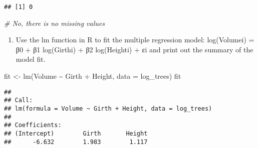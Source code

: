 \documentclass[
]{article}
\newenvironment{Shaded}{\begin{snugshade}}{\end{snugshade}}
\newcommand{\AttributeTok}[1]{\textcolor[rgb]{0.77,0.63,0.00}{#1}}
\newcommand{\CommentTok}[1]{\textcolor[rgb]{0.56,0.35,0.01}{\textit{#1}}}
\newcommand{\DecValTok}[1]{\textcolor[rgb]{0.00,0.00,0.81}{#1}}
\newcommand{\FloatTok}[1]{\textcolor[rgb]{0.00,0.00,0.81}{#1}}
\newcommand{\FunctionTok}[1]{\textcolor[rgb]{0.00,0.00,0.00}{#1}}
\newcommand{\NormalTok}[1]{#1}
\newcommand{\OtherTok}[1]{\textcolor[rgb]{0.56,0.35,0.01}{#1}}
\newcommand{\SpecialCharTok}[1]{\textcolor[rgb]{0.00,0.00,0.00}{#1}}
\providecommand{\tightlist}{%
  \setlength{\itemsep}{0pt}\setlength{\parskip}{0pt}}
\begin{document}
\begin{verbatim}
## [1] 0
\end{verbatim}

\begin{Shaded}
\begin{Highlighting}[]
\CommentTok{\# No, there is no missing values}
\end{Highlighting}
\end{Shaded}

\begin{enumerate}
\def\labelenumi{(\alph{enumi})}
\setcounter{enumi}{4}
\tightlist
\item
  Use the lm function in R to fit the multiple regression model:
  log(Volumei) = β0 + β1 log(Girthi) + β2 log(Heighti) + εi and print
  out the summary of the model fit.
\end{enumerate}

\begin{Shaded}
\begin{Highlighting}[]
\NormalTok{fit }\OtherTok{\textless{}{-}} \FunctionTok{lm}\NormalTok{(Volume }\SpecialCharTok{\textasciitilde{}}\NormalTok{ Girth }\SpecialCharTok{+}\NormalTok{ Height, }\AttributeTok{data =}\NormalTok{ log\_trees)}
\NormalTok{fit}
\end{Highlighting}
\end{Shaded}

\begin{verbatim}
## 
## Call:
## lm(formula = Volume ~ Girth + Height, data = log_trees)
## 
## Coefficients:
## (Intercept)        Girth       Height  
##      -6.632        1.983        1.117
\end{verbatim}

\begin{Shaded}
\end{Shaded}
\end{document}
